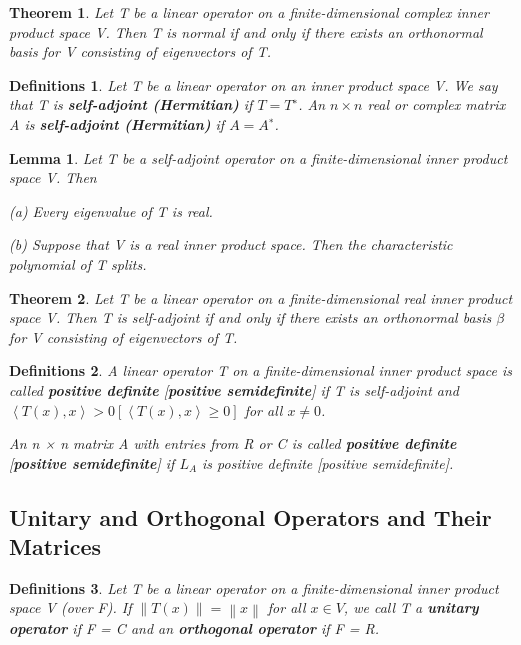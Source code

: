 \documentclass{article}
\newcommand{\norm}[1]{\left\lVert#1\right\rVert}
\newcommand{\bd}[1]{\textbf{#1}}
\newcommand{\ip}[1]{\left\langle {#1}\right\rangle} %
\theoremstyle{plain}
\newtheorem{theorem}{Theorem}[section]
\newtheorem*{lemma}{Lemma}
\newtheorem*{definitions}{Definitions}
\theoremstyle{plain} %
\begin{document}
\begin{theorem}
  Let T be a linear operator on a finite-dimensional complex inner product space V. Then T is normal if and only if there exists an orthonormal basis for V consisting of eigenvectors of T.
\end{theorem}

\begin{definitions}
  Let T be a linear operator on an inner product space V. We say that T is \bd{self-adjoint (Hermitian)} if $T = T^∗$. An $n \times n$ real or complex matrix A is \bd{self-adjoint (Hermitian)} if $A = A^∗$.
\end{definitions}

\begin{lemma}
  Let T be a self-adjoint operator on a finite-dimensional inner
product space V. Then

(a) Every eigenvalue of T is real.

(b) Suppose that V is a real inner product space. Then the characteristic polynomial of T splits.
\end{lemma}

\begin{theorem}
  Let T be a linear operator on a finite-dimensional real inner product space V. Then T is self-adjoint if and only if there exists an orthonormal basis $\beta$ for V consisting of eigenvectors of T.
\end{theorem}

\begin{definitions}
  A linear operator T on a finite-dimensional inner product
space is called \bd{positive definite} [\bd{positive semidefinite}] if T is self-adjoint and $\ip{T(x), x} > 0 [\ip{T(x), x} \geq 0]$ for all $x \neq 0$.

  An n × n matrix A with entries from R or C is called \bd{positive definite} [\bd{positive semidefinite}] if $L_A$ is positive definite [positive semidefinite].
\end{definitions}

\subsection{Unitary and Orthogonal Operators and Their Matrices}

\begin{definitions}
  Let T be a linear operator on a finite-dimensional inner product space V (over F). If $\norm{T(x)} = \norm{x}$ for all $x \in V$, we call T a \bd{unitary operator} if F = C and an \bd{orthogonal operator} if F = R.
\end{definitions}
\end{document}
